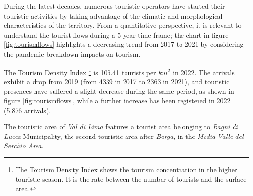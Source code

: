 \documentclass[sustainability,article,submit,pdftex,moreauthors]{Definitions/mdpi}
\begin{document}
During the latest decades, numerous touristic operators have started their touristic activities by taking advantage of the climatic and morphological characteristics of the territory. From a quantitative perspective, it is relevant to understand the tourist flows during a 5-year time frame; the chart in figure \ref{fig:tourismflows} highlights a decreasing trend from 2017 to 2021 by considering the pandemic breakdown impacts on tourism.



The Tourism Density Index \footnote{The Tourism Density Index shows the tourism concentration in the higher touristic season. It is the rate between the number of tourists and the surface area.} is 106.41 tourists per $km^2$ in 2022. The arrivals exhibit a drop from 2019 (from  4339 in 2017 to 2363 in 2021), and touristic presences have suffered a slight decrease during the same period, as shown in figure \ref{fig:tourismflows}, while a further increase has been registered in 2022 (5.876 arrivals).

The touristic area of \emph{Val di Lima} features a tourist area belonging to \emph{Bagni di Lucca} Municipality, the second touristic area after \textit{Barga}, in the \textit{Media Valle del Serchio Area}.


\end{document}
